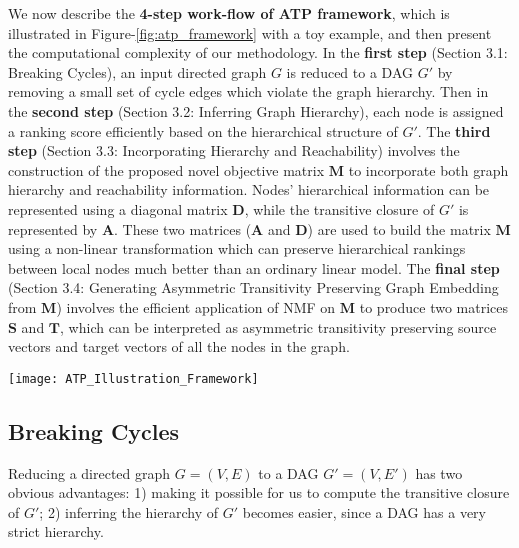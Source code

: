 \documentclass[letterpaper]{article} \usepackage{aaai19}  \usepackage{times}  \usepackage{helvet}  \usepackage{courier}  \usepackage{url}  \usepackage{graphicx}  \usepackage{booktabs} \usepackage{xcolor}
\begin{document}
We now describe the \textbf{4-step work-flow of ATP framework}, which is illustrated in Figure-\ref{fig:atp_framework} with a toy example, and then present the computational complexity of our methodology. In the \textbf{first step}  (Section 3.1: Breaking Cycles), an input directed graph $G$ is reduced to a DAG $G'$ by removing a small set of cycle edges which violate the graph hierarchy. 
Then in the \textbf{second step} (Section 3.2: Inferring Graph Hierarchy), each node is assigned a ranking score efficiently based on the hierarchical structure of $G'$. 
The \textbf{third step} (Section 3.3: Incorporating Hierarchy and Reachability) involves the construction of the proposed novel objective matrix $\boldsymbol{M}$ to incorporate both graph hierarchy and reachability information.
Nodes' hierarchical information can be represented using a diagonal matrix $\boldsymbol{D}$, while the transitive closure of $G'$ is represented by $\boldsymbol{A}$.
These two matrices ($\boldsymbol{A}$ and $\boldsymbol{D}$) are used to build the matrix $\boldsymbol{M}$ using a non-linear transformation which can preserve hierarchical rankings between local nodes much better than an ordinary linear model.
The \textbf{final step} (Section 3.4: Generating Asymmetric Transitivity Preserving Graph Embedding from $\boldsymbol{M}$) involves the efficient application of NMF on $\boldsymbol{M}$ to produce two matrices $\boldsymbol{S}$ and $\boldsymbol{T}$, which can be interpreted as asymmetric transitivity preserving source vectors and target vectors of all the nodes in the graph.




\begin{figure*}[!ht]
    \centering
    \small
    \texttt{[image: ATP\_Illustration\_Framework]}
   \caption{\small Illustration of {\bf A}symmetric {\bf T}ransitivity {\bf P}reserving ({\bf ATP}) graph embedding framework} 
    \label{fig:atp_framework}
\end{figure*}




\subsection{Breaking Cycles}
\label{sec:breaking_cycles}

Reducing a directed graph $G = (V,E)$ to a DAG $G' = (V,E')$ has two obvious advantages: 1) making it possible for us to compute the transitive closure of $G'$; 2) inferring the hierarchy of $G'$ becomes easier, since a DAG has a very strict hierarchy. 
\end{document}
